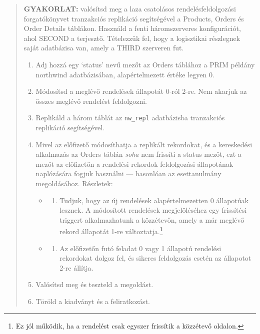 \documentclass[
  magyar,
]{article}
\providecommand{\tightlist}{%
  \setlength{\itemsep}{0pt}\setlength{\parskip}{0pt}}
\begin{document}
\begin{quote}
\textbf{GYAKORLAT:} valósítsd meg a laza csatolásos rendelésfeldolgozási
forgatókönyvet tranzakciós replikáció segítségével a Products, Orders és
Order Details táblákon. Használd a fenti háromszerveres konfigurációt,
ahol SECOND a terjesztő. Tételezzük fel, hogy a logisztikai részlegnek
saját adatbázisa van, amely a THIRD szerveren fut.

\begin{enumerate}
\def\labelenumi{\arabic{enumi}.}
\tightlist
\item
  Adj hozzá egy `status' nevű mezőt az Orders táblához a PRIM példány
  northwind adatbázisában, alapértelmezett értéke legyen 0.
\item
  Módosítsd a meglévő rendelések állapotát 0-ról 2-re. Nem akarjuk az
  összes meglévő rendelést feldolgozni.
\item
  Replikáld a három táblát az \texttt{nw\_repl} adatbázisba tranzakciós
  replikáció segítségével.
\item
  Mivel az előfizető módosíthatja a replikált rekordokat, és a
  kereskedési alkalmazás az Orders táblán \emph{soha} nem frissíti a
  status mezőt, ezt a mezőt az előfizetőn a rendelési rekordok
  feldolgozási állapotának naplózására fogjuk használni --- hasonlóan az
  esettanulmány megoldásához. Részletek:

  \begin{itemize}
  \tightlist
  \item
    \begin{enumerate}
    \def\labelenumii{\alph{enumii}.}
    \tightlist
    \item
      Tudjuk, hogy az új rendelések alapértelmezetten 0 állapotúak
      lesznek. A módosított rendelések megjelöléséhez egy frissítési
      triggert alkalmazhatunk a közzétevőn, amely a már meglévő rekord
      állapotát 1-re változtatja.\footnote{Ez jól működik, ha a
        rendelést csak egyszer frissítik a közzétevő oldalon.}
    \end{enumerate}
  \item
    \begin{enumerate}
    \def\labelenumii{\alph{enumii}.}
    \setcounter{enumii}{1}
    \tightlist
    \item
      Az előfizetőn futó feladat 0 vagy 1 állapotú rendelési rekordokat
      dolgoz fel, és sikeres feldolgozás esetén az állapotot 2-re
      állítja.
    \end{enumerate}
  \end{itemize}
\item
  Valósítsd meg és teszteld a megoldást.
\item
  Töröld a kiadványt és a feliratkozást.
\end{enumerate}
\end{quote}
\end{document}
